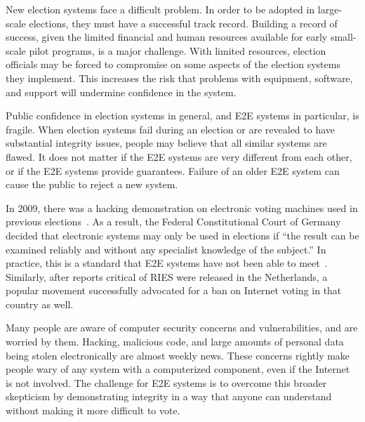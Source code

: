 New election systems face a difficult problem. In order to be adopted
in large-scale elections, they must have a successful track
record. Building a record of success, given the limited financial and
human resources available for early small-scale pilot programs, is a
major challenge. With limited resources, election officials may be
forced to compromise on some aspects of the election systems they
implement. This increases the risk that problems with equipment,
software, and support will undermine confidence in the system.

Public confidence in election systems in general, and E2E systems in
particular, is fragile. When election systems fail during an election
or are revealed to have substantial integrity issues, people may
believe that all similar systems are flawed. It does not matter if the
E2E systems are very different from each other, or if the E2E systems
provide guarantees. Failure of an older E2E system can cause the
public to reject a new system.

In 2009, there was a hacking demonstration on electronic voting
machines used in previous elections~\cite{germany2009decision}. As a
result, the Federal Constitutional Court of Germany decided that
electronic systems may only be used in elections if ``the result can
be examined reliably and without any specialist knowledge of the
subject.'' In practice, this is a standard that E2E systems have not
been able to meet~\cite{byrne2007usability}. Similarly, after reports
critical of RIES were released in the Netherlands, a popular movement
successfully advocated for a ban on Internet voting in that country as
well.

Many people are aware of computer security concerns and
vulnerabilities, and are worried by them. Hacking, malicious code, and
large amounts of personal data being stolen electronically are almost
weekly news. These concerns rightly make people wary of any system
with a computerized component, even if the Internet is not
involved. The challenge for E2E systems is to overcome this broader
skepticism by demonstrating integrity in a way that anyone can
understand without making it more difficult to vote.

